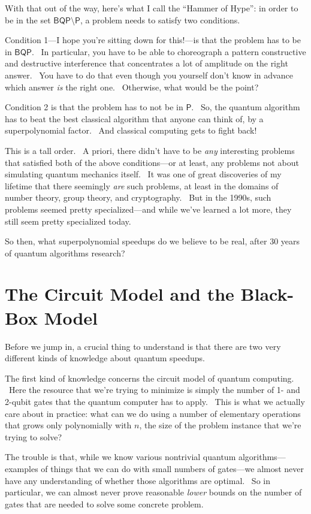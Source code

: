\documentclass[11pt]{article}
\begin{document}
With that out of the way, here's what I call the ``Hammer of Hype'': in order to be in the set $\mathsf{BQP}\setminus \mathsf{P}$, a problem needs to satisfy two conditions.

Condition 1---I hope you're sitting down for this!---is that the problem has to be in $\mathsf{BQP}$. \ In particular, you have to be able to choreograph a pattern constructive and destructive interference that concentrates a lot of amplitude on the right answer. \ You have to do that even though you yourself don't know in advance which answer \emph{is} the right one. \ Otherwise, what would be the point?

Condition 2 is that the problem has to not be in $\mathsf{P}$. \ So, the quantum algorithm has to beat the best classical algorithm that anyone can think of, by a superpolynomial factor. \ And classical computing gets to fight back!

This is a tall order. \ A priori, there didn't have to be \emph{any} interesting problems that satisfied both of the above conditions---or at least, any problems not about simulating quantum mechanics itself. \ It was one of great discoveries of my lifetime that there seemingly \emph{are} such problems, at least in the domains of number theory, group theory, and cryptography. \ But in the 1990s, such problems seemed pretty specialized---and while we've learned a lot more, they still seem pretty specialized today.

So then, what superpolynomial speedups do we believe to be real, after 30 years of quantum algorithms research?


\section{The Circuit Model and the Black-Box Model}

Before we jump in, a crucial thing to understand is that there are two very different kinds of knowledge about quantum speedups.

The first kind of knowledge concerns the circuit model of quantum computing. \ Here the resource that we're trying to minimize is simply the number of 1- and 2-qubit gates that the quantum computer has to apply. \ This is what we actually care about in practice: what can we do using a number of elementary operations that grows only polynomially with $n$, the size of the problem instance that we're trying to solve?

The trouble is that, while we know various nontrivial quantum algorithms---examples of things that we can do with small numbers of gates---we almost never have any understanding of whether those algorithms are optimal. \ So in particular, we can almost never prove reasonable \emph{lower} bounds on the number of gates that are needed to solve some concrete problem.
\end{document}
